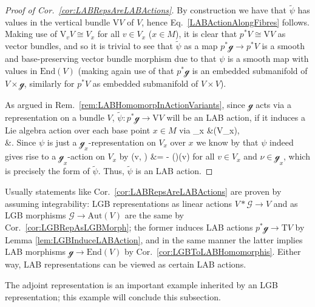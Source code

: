\documentclass[a4paper,oneside,11pt,bibliography=totoc]{scrartcl}
\def\bas#1\eas{\begin{align*}#1\end{align*}}
\theoremstyle{plain}
\theoremstyle{remark}
\theoremstyle{definition}
\begin{document}
\begin{proof}[Proof of Cor.\ \ref{cor:LABRepsAreLABActions}]
\leavevmode\newline
By construction we have that $\widetilde{\psi}$ has values in the vertical bundle $\mathrm{V}V$ of $V$, hence Eq.\ \eqref{LABActionAlongFibres} follows. 
Making use of $\mathrm{V}_vV \cong V_x$ for all $v\in V_x$ ($x \in M$), it is clear that $p^*V \cong \mathrm{V}V$ as vector bundles, and so it is trivial to see that $\widetilde{\psi}$ as a map $p^*\mathcal{g} \to p^*V$ is a smooth and base-preserving vector bundle morphism due to that $\psi$ is a smooth map with values in $\mathrm{End}(V)$ (making again use of that $p^*\mathcal{g}$ is an embedded submanifold of $V \times \mathcal{g}$, similarly for $p^*V$ as embedded submanifold of $V \times V$).

As argued in Rem.\ \ref{rem:LABHomomorpInActionVariants}, since $\mathcal{g}$ acts via a representation on a bundle $V$, $\widetilde{\psi}: p^*\mathcal{g} \to \mathrm{V}V$ will be an LAB action, if it induces a Lie algebra action over each base point $x \in M$ via
\bas
\mathcal{g}_x &\to {}(V_x),\\
\nu &\mapsto {}.
\eas
Since $\psi$ is just a $\mathcal{g}_x$-representation on $V_x$ over $x$ we know by \cite[\S 2.1, proof of Prop.\ 2.1.16, page 22]{MyThesis} that $\psi$ indeed gives rise to a $\mathcal{g}_x$-action on $V_x$ by
\bas
\widetilde{\psi}\mleft(v, \nu\mright)
&=
- \psi(\nu)(v)
\eas
for all $v \in V_x$ and $\nu \in \mathcal{g}_x$, which is precisely the form of $\widetilde{\psi}$. Thus, $\widetilde{\psi}$ is an LAB action.
\end{proof}

Usually statements like Cor.\ \ref{cor:LABRepsAreLABActions} are proven by assuming integrability: LGB representations as linear actions $V*\mathcal{G} \to V$ and as LGB morphisms $\mathcal{G} \to \mathrm{Aut}(V)$ are the same by Cor.\ \ref{cor:LGBRepAsLGBMorph}; the former induces LAB actions $p^*\mathcal{g} \to \mathrm{T}V$ by Lemma \ref{lem:LGBInduceLABAction}, and in the same manner the latter implies LAB morphisms $\mathcal{g} \to \mathrm{End}(V)$ by Cor.\ \ref{cor:LGBToLABHomomorphis}. Either way, LAB representations can be viewed as certain LAB actions. 

The adjoint representation is an important example inherited by an LGB representation; this example will conclude this subsection.
\end{document}
